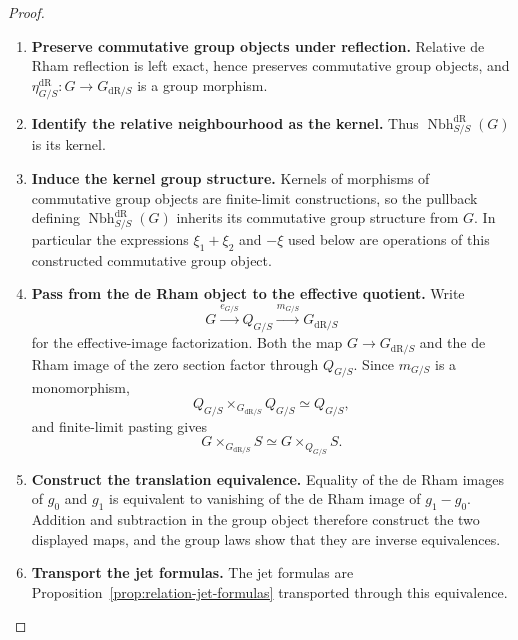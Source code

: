 \begin{proof}
\leavevmode
\begin{enumerate}[label=\textup{(\arabic*)}]
    \item \textbf{Preserve commutative group objects under reflection.}
Relative de Rham reflection is left exact, hence preserves commutative group
objects, and \(\eta_{G/S}^{\mathrm{dR}}:G\to G_{\mathrm{dR}/S}\) is a group morphism.

    \item \textbf{Identify the relative neighbourhood as the kernel.}
Thus
\(\operatorname{Nbh}^{\mathrm{dR}}_{S/S}(G)\) is its kernel.

    \item \textbf{Induce the kernel group structure.}
Kernels of morphisms of commutative group objects are
finite-limit constructions, so the pullback defining \(\operatorname{Nbh}^{\mathrm{dR}}_{S/S}(G)\) inherits its commutative group structure from \(G\). In particular the expressions \(\xi_1+\xi_2\) and \(-\xi\) used below
are operations of this constructed commutative group object.

    \item \textbf{Pass from the de Rham object to the effective quotient.}
Write
\[
  G\xrightarrow{e_{G/S}}Q_{G/S}
  \xrightarrow{m_{G/S}}G_{\mathrm{dR}/S}
\]
for the effective-image factorization. Both the map
\(G\to G_{\mathrm{dR}/S}\) and the de Rham image of the zero section factor
through \(Q_{G/S}\). Since \(m_{G/S}\) is a monomorphism,
\[
  Q_{G/S}\times_{G_{\mathrm{dR}/S}}Q_{G/S}
  \simeq
  Q_{G/S},
\]
and finite-limit pasting gives
\[
  G\times_{G_{\mathrm{dR}/S}}S
  \simeq
  G\times_{Q_{G/S}}S.
\]

    \item \textbf{Construct the translation equivalence.}
Equality of the de Rham images of \(g_0\) and \(g_1\)
is equivalent to vanishing of the de Rham image of \(g_1-g_0\). Addition and
subtraction in the group object therefore construct the two displayed maps,
and the group laws show that they are inverse equivalences.

    \item \textbf{Transport the jet formulas.}
The jet
formulas are Proposition~\ref{prop:relation-jet-formulas} transported through
this equivalence.
\end{enumerate}
\end{proof}

